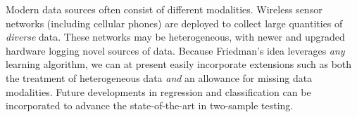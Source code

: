 Modern data sources often consist of different modalities.  Wireless
sensor networks (including cellular phones) are deployed to collect
large quantities of \emph{diverse} data.  These networks may be
heterogeneous, with newer and upgraded hardware logging novel sources
of data.  Because Friedman's idea leverages \emph{any} learning algorithm, we
can at present easily incorporate extensions such as both the treatment of
heterogeneous data \emph{and} an allowance for missing data
modalities.  Future developments in regression and classification can
be incorporated to advance the state-of-the-art in two-sample testing.
